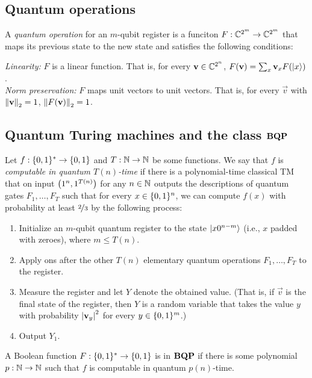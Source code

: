 \documentclass[12pt]{article}
\begin{document}
\subsection{Quantum operations}
\begin{defn}
  \label{defn:op}
  A \emph{quantum operation} for an $m$-qubit register is a funciton $F :
  \CC^{2^m} \to \CC^{2^m}$ that maps its previous state to the new state and
  satisfies the following conditions:
  \begin{adjustwidth}{0.25in}{0in}
    \emph{Linearity:} $F$ is a linear function. That is, for every $\vec{v} \in
    \CC^{2^n}$, $F(\vec{v}) = \sum_x \vec{v}_x F(\reg*{x})$. \\
    \emph{Norm preservation:} $F$ maps unit vectors to unit vectors. That is,
    for every $\vec{v}$ with $\norm*{\vec{v}}_2=1$, $\norm*{F(\vec{v})}_2=1$.
  \end{adjustwidth}
\end{defn}

\subsection{Quantum Turing machines and the class $\BQP$}
\begin{defn}
  \label{defn:bqp}
  Let $f : \zo^* \to \zo$ and $T : \NN \to \NN$ be some functions. We say that
  $f$ is \emph{computable in quantum $T(n)$-time} if there is a polynomial-time
  classical TM that on input $\paren*{1^n, 1^{T(n)}}$ for any $n \in \NN$
  outputs the descriptions of quantum gates $F_1, \dots, F_T$ such that for
  every $x\in \zo^n$, we can compute $f(x)$ with probability at least
  $\nfrac{2}{3}$ by the following process:
  \begin{enumerate}
    \item Initialize an $m$-qubit quantum register to the state
      $\reg*{x0^{n-m}}$ (i.e., $x$ padded with zeroes), where $m \le T(n)$.
    \item Apply ons after the other $T(n)$ elementary quantum operations $F_1,
      \dots, F_T$ to the register.
    \item Measure the register and let $Y$ denote the obtained value. (That is,
      if $\vec{v}$ is the final state of the register, then $Y$ is a random
      variable that takes the value $y$ with probability $\abs*{\vec{v}_y}^2$
      for every $y \in \zo^m$.)
    \item Output $Y_1$.
  \end{enumerate}
  A Boolean function $F : \zo^* \to \zo$ is in $\BQP$ if there is some
  polynomial $p : \NN \to \NN$ such that $f$ is computable in quantum
  $p(n)$-time.
\end{defn}
\end{document}
